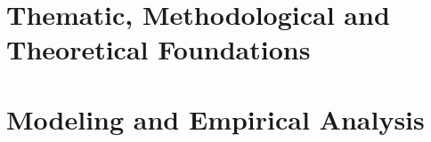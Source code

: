 







\ctparttext{} %

\part{Thematic, Methodological and Theoretical Foundations} %


























\cleardoublepage %


\ctparttext{} %


\part{Modeling and Empirical Analysis} %









